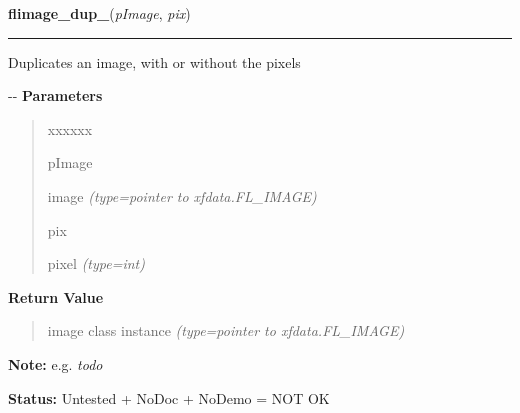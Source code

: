 \hspace{.8\funcindent}\begin{boxedminipage}{\funcwidth}

    \raggedright \textbf{flimage\_dup\_}(\textit{pImage}, \textit{pix})

    \vspace{-1.5ex}

    \rule{\textwidth}{0.5\fboxrule}
\setlength{\parskip}{2ex}

Duplicates an image, with or without the pixels

-{}-
\setlength{\parskip}{1ex}
      \textbf{Parameters}
      \vspace{-1ex}

      \begin{quote}
        \begin{Ventry}{xxxxxx}

          \item[pImage]


image
            {\it (type=pointer to xfdata.FL\_IMAGE)}

          \item[pix]


pixel
            {\it (type=int)}

        \end{Ventry}

      \end{quote}

      \textbf{Return Value}
    \vspace{-1ex}

      \begin{quote}

image class instance
      {\it (type=pointer to xfdata.FL\_IMAGE)}

      \end{quote}

\textbf{Note:} 
e.g. \emph{todo}


\textbf{Status:} 
Untested + NoDoc + NoDemo = NOT OK


    \end{boxedminipage}

    \label{xformslib:flflimage:flimage_enable_bmp}

    \vspace{0.5ex}

